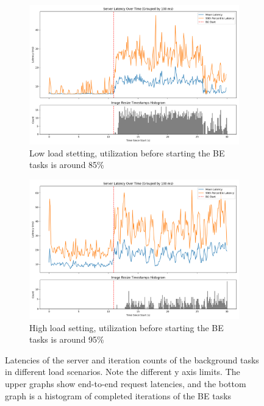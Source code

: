 \begin{figure}[t]
    \centering
    \begin{subfigure}[b]{0.49\columnwidth}
        \includegraphics[width=\columnwidth]{graphs/unedited-weight-low-two.png}
        \caption{Low load stetting, utilization before starting the BE tasks is
        around 85\%}\label{fig:unedited-weight-low-two}
    \end{subfigure}
    \hspace{\fill}
    \begin{subfigure}[b]{0.49\columnwidth}
        \includegraphics[width=\columnwidth]{graphs/unedited-weight-high-two.png}
        \caption{High load setting, utilization before starting the BE tasks is
        around 95\%}\label{fig:unedited-weight-high-two}
    \end{subfigure}
    \vspace{4pt}
    \caption{Latencies of the server and iteration counts of the background
    tasks in different load scenarios. Note the different y axis limits. The
    upper graphs show end-to-end request latencies, and the bottom graph is a
    histogram of completed iterations of the BE tasks}\label{fig:unedited-weight}
\end{figure}

